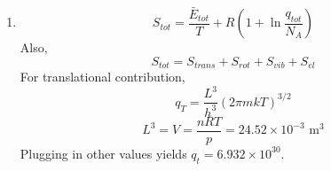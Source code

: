 \begin{solution}\
    \begin{enumerate}
        \item \begin{equation*}
                  S_{tot}=\frac{\bar{E}_{tot}}{T}+R\left(1+\ln\frac{q_{tot}}{N_A}\right)
              \end{equation*}
              Also,
              \begin{equation*}
                  S_{tot}=S_{trans}+S_{rot}+S_{vib}+S_{el}
              \end{equation*}
              For translational contribution,
              \begin{equation*}
                  q_T=\frac{L^3}{h^3}(2\pi mkT)^{3/2}
              \end{equation*}
              \begin{equation*}
                  L^3=V=\frac{nRT}{p}=24.52\times10^{-3}\text{ m}^3
              \end{equation*}
              Plugging in other values yields $q_t = 6.932\times10^{30}$.


\end{enumerate}
\end{solution}
